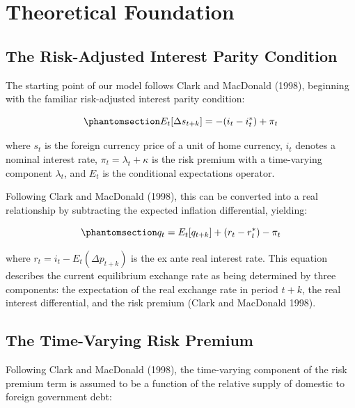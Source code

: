 \documentclass[
  manuscript=article,
  layout=publish,
  year=2026,
  volume=6,
]{den}
\begin{document}
\section{Theoretical Foundation}\label{theoretical-foundation}

\subsection{The Risk-Adjusted Interest Parity
Condition}\label{the-risk-adjusted-interest-parity-condition}

The starting point of our model follows Clark and MacDonald (1998),
beginning with the familiar risk-adjusted interest parity condition:

\begin{equation}\phantomsection\label{eq-risk-adjusted-interest-parity}{
E_t[\Delta s_{t+k}] = -(i_t - i_t^*) + \pi_t
}\end{equation}

where \(s_t\) is the foreign currency price of a unit of home currency,
\(i_t\) denotes a nominal interest rate, \(\pi_t = \lambda_t + \kappa\)
is the risk premium with a time-varying component \(\lambda_t\), and
\(E_t\) is the conditional expectations operator.

Following Clark and MacDonald (1998), this can be converted into a real
relationship by subtracting the expected inflation differential,
yielding:

\begin{equation}\phantomsection\label{eq-real-interest-parity}{
q_t = E_t[q_{t+k}] + (r_t - r_t^*) - \pi_t
}\end{equation}

where \(r_t = i_t - E_t(\Delta p_{t+k})\) is the ex ante real interest
rate. This equation describes the current equilibrium exchange rate as
being determined by three components: the expectation of the real
exchange rate in period \(t+k\), the real interest differential, and the
risk premium (Clark and MacDonald 1998).

\subsection{The Time-Varying Risk
Premium}\label{the-time-varying-risk-premium}

Following Clark and MacDonald (1998), the time-varying component of the
risk premium term is assumed to be a function of the relative supply of
domestic to foreign government debt:
\end{document}
